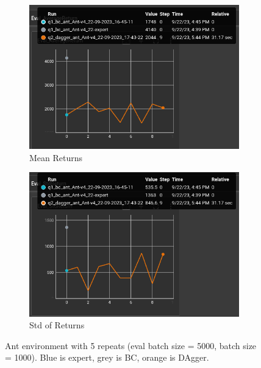 \documentclass[11pt]{article}
\begin{document}
\begin{figure}[h]
    \centering
    \begin{subfigure}[b]{0.47\textwidth}
        \centering
        \includegraphics[width=\textwidth]{09-22-dag_ant_mean}
        \caption{Mean Returns}
        \label{fig:ant_mean}
    \end{subfigure}
    \hfill
    \begin{subfigure}[b]{0.47\textwidth}
        \centering
        \includegraphics[width=\textwidth]{09-22-dag_ant_std}
        \caption{Std of Returns}
        \label{fig:ant_std}
    \end{subfigure}
    \caption{Ant environment with 5 repeats (eval batch size = 5000, batch size = 1000). Blue is expert, grey is BC, orange is DAgger.}
    \label{fig:ant_dag}
\end{figure}
\end{document}
